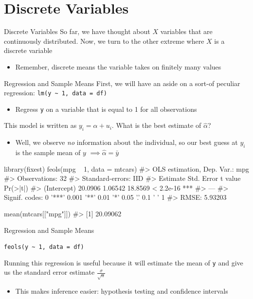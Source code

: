 \documentclass[aspectratio=169,t,11pt,table]{beamer}
\begin{document}
\section{Discrete Variables}

\begin{frame}{Discrete Variables}
  So far, we have thought about $X$ variables that are continuously distributed. Now, we turn to the other extreme where $X$ is a discrete variable
  \begin{itemize}
    \item Remember, \alert{discrete} means the variable takes on finitely many values
  \end{itemize}
\end{frame}

\begin{frame}{Regression and Sample Means}
    First, we will have an aside on a sort-of peculiar regression: 
    \texttt{lm(y \textasciitilde{} 1, data = df)}
    \begin{itemize}
      \item Regress \texttt{y} on a variable that is equal to 1 for all observations
    \end{itemize}

    \pause
    \bigskip
    This model is written as $y_i = \alpha + u_i$. What is the best estimate of $\hat{\alpha}$?
    \begin{itemize}
      \item Well, we observe \emph{no} information about the individual, so our best guess at $y_i$ is the sample mean of $y$ $\implies \hat{\alpha} = \bar{y}$
    \end{itemize} 
\end{frame}

\begin{frame}[fragile]{}
  \begin{codeblock}
library(fixest)
feols(mpg ~ 1, data = mtcars)
#> OLS estimation, Dep. Var.: mpg
#> Observations: 32
#> Standard-errors: IID 
#>             Estimate Std. Error t value  Pr(>|t|)    
#> (Intercept)  20.0906    1.06542 18.8569 < 2.2e-16 ***
#> ---
#> Signif. codes:  0 '***' 0.001 '**' 0.01 '*' 0.05 '.' 0.1 ' ' 1
#> RMSE: 5.93203

mean(mtcars[["mpg"]])
#> [1] 20.09062
  \end{codeblock}
\end{frame}

\begin{frame}{Regression and Sample Means}
  \begin{center}
    \texttt{feols(y \textasciitilde{} 1, data = df)}
  \end{center}

  \bigskip
  Running this regression is useful because it will estimate the mean of \texttt{y} and give us the standard error estimate $\frac{\sigma}{\sqrt{n}}$
  \begin{itemize}
    \item This makes inference easier: hypothesis testing and confidence intervals 
  \end{itemize}
\end{frame}
\end{document}
